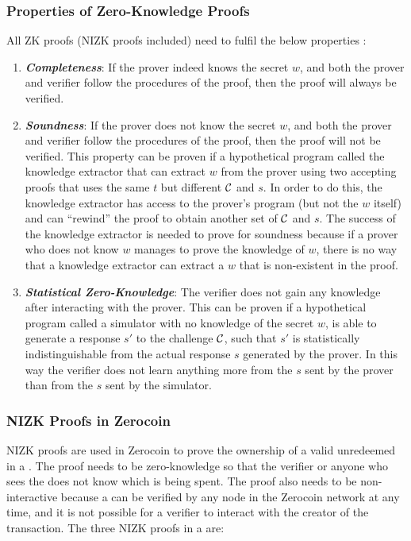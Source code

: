 \subsubsection{Properties of Zero-Knowledge Proofs}
\label{sec:3-Properties of Zero-Knowledge Proofs}
All ZK proofs (NIZK proofs included) need to fulfil the below properties \cite{Kiayias}:
\begin{enumerate}
	\item \textbf{\textit{Completeness}}: If the prover indeed knows the secret $w$, and both the prover and verifier follow the procedures of the proof, then the proof will always be verified.
	\item \textbf{\textit{Soundness}}: If the prover does not know the secret $w$, and both the prover and verifier follow the procedures of the proof, then the proof will not be verified. This property can be proven if a hypothetical program called the knowledge extractor that can extract $w$ from the prover using two accepting proofs that uses the same $t$ but different $\mathcal{C}$ and $s$. In order to do this, the knowledge extractor has access to the prover’s program (but not the $w$ itself) and can “rewind” the proof to obtain another set of $\mathcal{C}$ and $s$. The success of the knowledge extractor is needed to prove for soundness because if a prover who does not know $w$ manages to prove the knowledge of $w$, there is no way that a knowledge extractor can extract a $w$ that is non-existent in the proof.
	\item \textbf{\textit{Statistical Zero-Knowledge}}: The verifier does not gain any knowledge after interacting with the prover. This can be proven if a hypothetical program called a simulator with no knowledge of the secret $w$, is able to generate a response $s'$ to the challenge $\mathcal{C}$, such that $s'$ is statistically indistinguishable from the actual response $s$ generated by the prover. In this way the verifier does not learn anything more from the $s$ sent by the prover than from the $s$ sent by the simulator.
\end{enumerate}

\subsubsection{NIZK Proofs in Zerocoin}
\label{sec:3-NIZK Proofs in Zerocoin}
NIZK proofs are used in Zerocoin to prove the ownership of a valid unredeemed \kwCoin{} in a . The proof needs to be zero-knowledge so that the verifier or anyone who sees the  does not know which \kwCoin{} is being spent. The proof also needs to be non-interactive because a  can be verified by any node in the Zerocoin network at any time, and it is not possible for a verifier to interact with the creator of the transaction. The three NIZK proofs in a  are:


